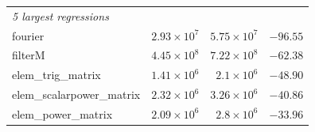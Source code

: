 \begin{table}[H]
\begin{tabular}{l r r r}
\midrule
\multicolumn{4}{l}{\emph{5 largest regressions }} \\
fourier                        & $2.93 \times 10^{7}$   & $5.75 \times 10^{7}$   & $-96.55$ \\
filterM                        & $4.45 \times 10^{8}$   & $7.22 \times 10^{8}$   & $-62.38$ \\
elem\_trig\_matrix             & $1.41 \times 10^{6}$   & $2.1 \times 10^{6}$    & $-48.90$ \\
elem\_scalarpower\_matrix      & $2.32 \times 10^{6}$   & $3.26 \times 10^{6}$   & $-40.86$ \\
elem\_power\_matrix            & $2.09 \times 10^{6}$   & $2.8 \times 10^{6}$    & $-33.96$ \\
\bottomrule
\end{tabular}
\end{table}
